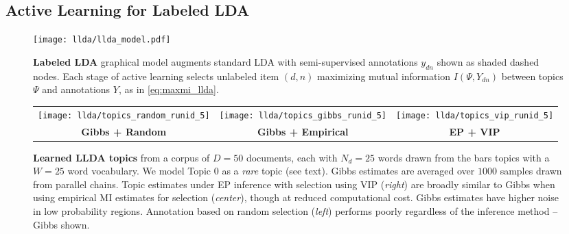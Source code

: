 
\subsection{Active Learning for Labeled LDA}\label{sec:llda}

\begin{figure}[t]
  \centering
  \texttt{[image: llda/llda\_model.pdf]}
  
  \caption{\small\textbf{Labeled LDA} graphical model augments
    standard LDA with semi-supervised annotations $y_{dn}$ shown as
    shaded dashed nodes.  Each stage of active learning selects
    unlabeled item $(d,n)$ maximizing mutual information
    $I(\Psi,Y_{dn})$ between topics $\Psi$ and annotations $Y$, as in
    \EQN\eqref{eq:maxmi_llda}.  }
  \label{fig:llda_model}
\end{figure}


\begin{figure*}
  \begin{tabular}{ccc}
    \hspace{-3mm}\texttt{[image: llda/topics\_random\_runid\_5]} &
    \texttt{[image: llda/topics\_gibbs\_runid\_5]} &
    \texttt{[image: llda/topics\_vip\_runid\_5]} \\
    {\small\textbf{Gibbs + Random}} & {\small\textbf{Gibbs +
        Empirical}} & {\small\textbf{EP + VIP}}
  \end{tabular}

  \caption{\small \textbf{Learned LLDA topics} from a corpus of $D=50$
    documents, each with $N_d=25$ words drawn from the bars topics
    with a $W=25$ word vocabulary.  We model Topic 0 as a \emph{rare}
    topic (see text).  Gibbs estimates are averaged over $1000$
    samples drawn from parallel chains.  Topic estimates under EP
    inference with selection using VIP (\emph{right}) are broadly
    similar to Gibbs when using empirical MI estimates for selection
    (\emph{center}), though at reduced computational cost.  Gibbs
    estimates have higher noise in low probability regions.
    Annotation based on random selection (\emph{left}) performs poorly
    regardless of the inference method -- Gibbs shown.}

  \label{fig:llda_topics}
\end{figure*}


